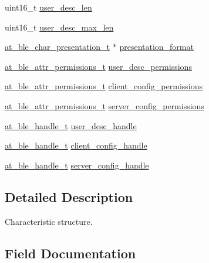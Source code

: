 \begin{DoxyCompactItemize}
uint16\+\_\+t \mbox{\hyperlink{structat__ble__characteristic__t_a3ff2debf9a9fb2766e86ce36d6262df6}{user\+\_\+desc\+\_\+len}}
\item 
uint16\+\_\+t \mbox{\hyperlink{structat__ble__characteristic__t_a1097a73ed510f3c33e3640e00aac3437}{user\+\_\+desc\+\_\+max\+\_\+len}}
\item 
\mbox{\hyperlink{structat__ble__char__presentation__t}{at\+\_\+ble\+\_\+char\+\_\+presentation\+\_\+t}} $\ast$ \mbox{\hyperlink{structat__ble__characteristic__t_a6309826fe45ca7d0688ead29f7ae01a2}{presentation\+\_\+format}}
\item 
\mbox{\hyperlink{at__ble__api_8h_a5d87cd231ea3f9e11846dba7cf75eb61}{at\+\_\+ble\+\_\+attr\+\_\+permissions\+\_\+t}} \mbox{\hyperlink{structat__ble__characteristic__t_a4e7e0eada43a36e3023774eb0ea3f602}{user\+\_\+desc\+\_\+permissions}}
\item 
\mbox{\hyperlink{at__ble__api_8h_a5d87cd231ea3f9e11846dba7cf75eb61}{at\+\_\+ble\+\_\+attr\+\_\+permissions\+\_\+t}} \mbox{\hyperlink{structat__ble__characteristic__t_a1568a524b40bd213a279b7c5b9450c89}{client\+\_\+config\+\_\+permissions}}
\item 
\mbox{\hyperlink{at__ble__api_8h_a5d87cd231ea3f9e11846dba7cf75eb61}{at\+\_\+ble\+\_\+attr\+\_\+permissions\+\_\+t}} \mbox{\hyperlink{structat__ble__characteristic__t_a017b02aee27db11073a2d6211c0f2b92}{server\+\_\+config\+\_\+permissions}}
\item 
\mbox{\hyperlink{at__ble__api_8h_abd23646d0c662860741f787efc8456f2}{at\+\_\+ble\+\_\+handle\+\_\+t}} \mbox{\hyperlink{structat__ble__characteristic__t_a1038ce1b0da35d52ca426e4f494c90e9}{user\+\_\+desc\+\_\+handle}}
\item 
\mbox{\hyperlink{at__ble__api_8h_abd23646d0c662860741f787efc8456f2}{at\+\_\+ble\+\_\+handle\+\_\+t}} \mbox{\hyperlink{structat__ble__characteristic__t_a78e34afb0f2fb8648bd0ef95814fe899}{client\+\_\+config\+\_\+handle}}
\item 
\mbox{\hyperlink{at__ble__api_8h_abd23646d0c662860741f787efc8456f2}{at\+\_\+ble\+\_\+handle\+\_\+t}} \mbox{\hyperlink{structat__ble__characteristic__t_ab15ca7113a171b6391a7e88fff8e81d0}{server\+\_\+config\+\_\+handle}}
\end{DoxyCompactItemize}


\subsection{Detailed Description}
Characteristic structure. 

\subsection{Field Documentation}
\mbox{\label{structat__ble__characteristic__t_a395cc1b8169d6bea42f786850fca098c}} 
